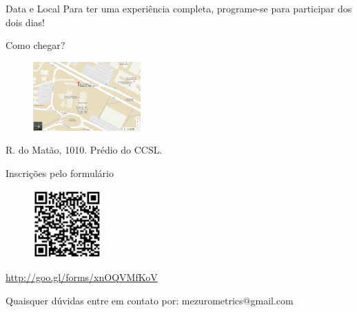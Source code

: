 \documentclass[final]{beamer} %
\begin{document}
\begin{frame}{}
\begin{block}{\large Data e Local}
        Para ter uma experiência completa, programe-se para participar dos dois dias!
    \end{block}%
    \vfill
    \noindent
    \begin{centering}%
    \begin{minipage}[t][5cm][t]{.486\textwidth}
      \center
      \begin{block}{\large Como chegar?}
        \center
        \begin{figure}[h]
          \includegraphics[height=100px]{ccsl-location}
        \end{figure}
        R. do Matão, 1010. Prédio do CCSL.
      \end{block}%
    \end{minipage}\hspace{.43005cm} %
\begin{minipage}[t][5cm][t]{.486\textwidth}
      \begin{block}{\large Inscrições pelo formulário}
        \center
        \begin{figure}[h]
          \includegraphics[height=99px]{design_sprint_form_qr}
        \end{figure}
        \url{http://goo.gl/forms/xnOQVMfKoV}
      \end{block}
    \end{minipage}
    \vfill
    {\large Quaisquer dúvidas entre em contato por: mezurometrics@gmail.com}
  \end{centering}
  \end{frame}
\end{document}
